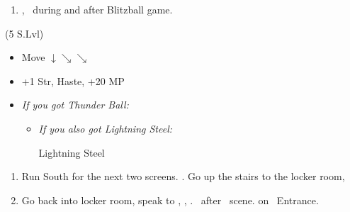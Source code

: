 \begin{enumerate}[resume]
    \item \cs[2:00], \sd\ during and after Blitzball game.
\end{enumerate}
\begin{spheregrid}
    \begin{itemize}
        \tidusf (5 S.Lvl)
        \begin{itemize}
            \item Move $\downarrow \searrow\searrow$
            \item +1 Str, Haste, +20 MP
        \end{itemize}
    \end{itemize}
\end{spheregrid}
\begin{equip}
    \begin{itemize}
        \item \textit{If you got Thunder Ball:}
        \begin{itemize}
            \wakkaf Thunder Ball
            \item \textit{If you also got Lightning Steel:}
            \begin{itemize}
                \tidusf Lightning Steel
            \end{itemize}
        \end{itemize}
    \end{itemize}
\end{equip}
\begin{enumerate}[resume]
    \item Run South for the next two screens. \save. Go up the stairs to the locker room, \sd
    \item Go back into locker room, speak to \wakka, \sd, \cs[1:20]. \sd\ after \lulu\ scene. \cs[1:40] on \auron\ Entrance.
\end{enumerate}
